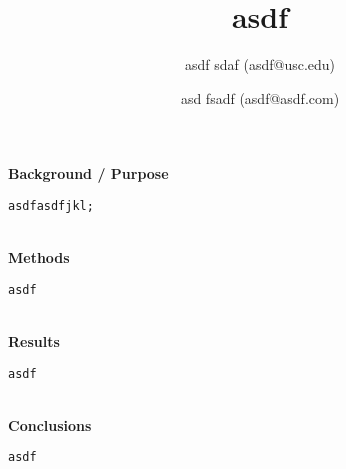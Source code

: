 \documentclass[11pt]{article}
\title{\vspace{-1cm}asdf
}
\author[]{asdf sdaf (asdf@usc.edu)}\author[]{asd fsadf (asdf@asdf.com)}
\affil[]{}
\date{}
\begin{document}
\maketitle
\thispagestyle{fancyfirst}
{\bfseries\large Background / Purpose}
\begin{lstlisting}[mathescape]
asdfasdfjkl;
\end{lstlisting}
\hfill \\
{\bfseries\large Methods}
\begin{lstlisting}[mathescape]
asdf
\end{lstlisting}
\hfill \\
{\bfseries\large Results}
\begin{lstlisting}[mathescape]
asdf
\end{lstlisting}
\hfill \\
{\bfseries\large Conclusions}
\begin{lstlisting}[mathescape]
asdf
\end{lstlisting}
\hfill \\
\end{document}
